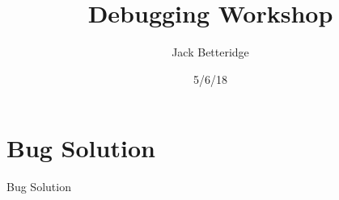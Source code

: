 \documentclass[pdf,aspectratio=43]{beamer}
\title{Debugging Workshop}
\subtitle{}
\author[Jack Betteridge]{
	Jack Betteridge\\
}
\date{5/6/18}
\theoremstyle{plain}
\theoremstyle{definition}
\theoremstyle{remark}
\theoremstyle{proof}
\begin{document}
\section{Bug Solution}
\begin{frame}{Bug Solution}

\end{frame}
\end{document}
